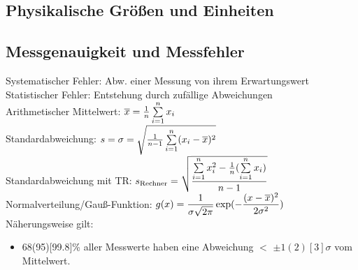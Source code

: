 \documentclass[fs, footer]{latex4ei}
\begin{document}
\vspace*{-10mm} %
\begin{multicols*}{4}



\iffalse
	\emphbox{
	\textbf{Wichtiger Hinweis}
	\\ Diese Formelsammlung ist noch in der Entwicklung und nicht prüfungstauglich ! \\ Allerdings würden wir uns über Unterstützung freuen das zu ändern. Wer Lust hat kann uns über das Kontaktformular auf www.latex4ei.de erreichen.
	}\fi
\section{Physikalische Größen und Einheiten}

\subsection{Messgenauigkeit und Messfehler}
Systematischer Fehler: Abw. einer Messung von ihrem Erwartungswert\\
Statistischer Fehler: Entstehung durch zufällige Abweichungen\\
Arithmetischer Mittelwert: $\ol x = \frac{1}{n}\sum_{i=1}^n x_i$\\
Standardabweichung: $s = \sigma = \sqrt{\frac{1}{n-1}\sum_{i=1}^n (x_i-\ol x)^2}$\\
Standardabweichung mit TR: $s_{\text{Rechner}} = \sqrt{ \fr{\sum_{i=1}^n x_i^2 - \frac{1}{n} (\sum_{i=1}^n x_i)}{n-1} }$\\
Normalverteilung/Gauß-Funktion: $g(x) = \dfrac{1}{\sigma \sqrt{2\pi}}\exp(-\dfrac{(x-\overline{x})^2}{2\sigma^2})$\\
Näherungsweise gilt: 
\begin{itemize}
\item 68(95)[99.8]\% aller Messwerte haben eine Abweichung $<$ $\pm 1(2)[3]\sigma$ vom Mittelwert.
\end{itemize}



\end{multicols*}
\end{document}
